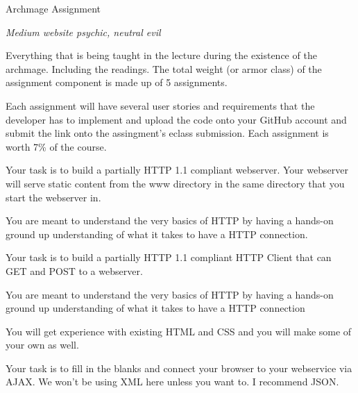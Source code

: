 \documentclass[../CMPUT-404-Notes.tex]{subfiles}
\begin{document}
\begin{monsterbox}{Archmage Assignment}
    \begin{hangingpar}
        \textit{Medium website psychic, neutral evil}
    \end{hangingpar}
    \dndline
    \basics[
        armorclass = 35,
        hitpoints = 35,
        speed = {Varies}
    ]
    \dndline
    \stats[
        STR = \stat{10},
        DEX = \stat{14},
        CON = \stat{12},
        INT = \stat{20},
        WIS = \stat{15},
        CHA = \stat{16},
    ]
    \dndline
    \details[
        languages = {Python, HTML, CSS, JavaScript},
        challenge = {12},
    ]
    \dndline
    Everything that is being taught in the lecture during the existence of the archmage. Including the readings.
    The total weight (or armor class) of the assignment component is made up of 5 assignments.   

    Each assignment will have several user stories and requirements that the developer has to implement and upload the code onto your GitHub account and submit the link onto the assingment's eclass submission. Each assignment is worth 7\% of the course.
    \begin{monsteraction}
        Your task is to build a partially HTTP 1.1 compliant webserver. Your webserver will serve static content from the www directory in the same directory that you start the webserver in.

        You are meant to understand the very basics of HTTP by having a hands-on ground up understanding of what it takes to have a HTTP connection.
    \end{monsteraction}
    \begin{monsteraction}
        Your task is to build a partially HTTP 1.1 compliant HTTP Client that can GET and POST to a webserver.

        You are meant to understand the very basics of HTTP by having a hands-on ground up understanding of what it takes to have a HTTP connection
    \end{monsteraction}
    \begin{monsteraction}
        You will get experience with existing HTML and CSS and you will make some of your own as well.
    \end{monsteraction}
    \begin{monsteraction}
        Your task is to fill in the blanks and connect your browser to your webservice via AJAX. We won’t be using XML here unless you want to. I recommend JSON.


\end{monsteraction}
\end{monsterbox}
\end{document}
